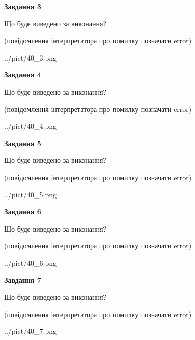 \documentclass[12pt, ukrainian]{article}
\begin{document}
{\begin {large}
{\begin {center}\textbf{Завдання 3}\end {center}}\par
Що буде виведено за виконання?\par
 (повідомлення інтерпретатора про помилку позначати error)\par
\begin{center}
	{../pict/40_3.png}
\end{center}
\newpage

{\begin {center}\textbf{Завдання 4}\end {center}}\par
Що буде виведено за виконання?\par
 (повідомлення інтерпретатора про помилку позначати error)\par
\begin{center}
	{../pict/40_4.png}
\end{center}
\newpage

{\begin {center}\textbf{Завдання 5}\end {center}}\par
Що буде виведено за виконання?\par
 (повідомлення інтерпретатора про помилку позначати error)\par
\begin{center}
	{../pict/40_5.png}
\end{center}
\newpage

{\begin {center}\textbf{Завдання 6}\end {center}}\par
Що буде виведено за виконання?\par
 (повідомлення інтерпретатора про помилку позначати error)\par
\begin{center}
	{../pict/40_6.png}
\end{center}
\newpage

{\begin {center}\textbf{Завдання 7}\end {center}}\par
Що буде виведено за виконання?\par
 (повідомлення інтерпретатора про помилку позначати error)\par
\begin{center}
	{../pict/40_7.png}
\end{center}
\newpage


\end{large}}
\end{document}
